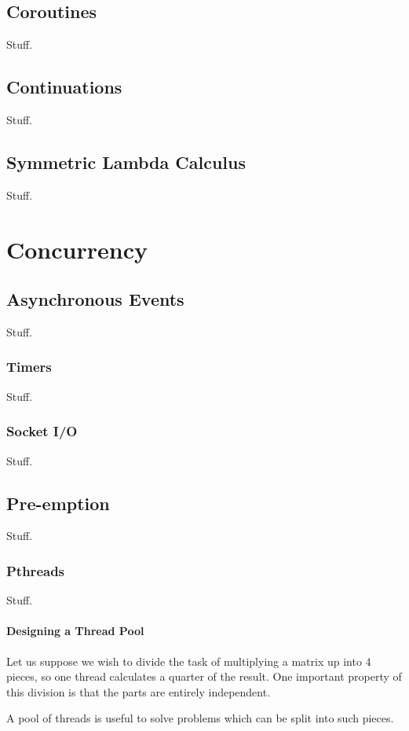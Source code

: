 \documentclass[oneside]{book}
\begin{document}
\chapter{Coroutines}
Stuff.
\chapter{Continuations}
Stuff.
\chapter{Symmetric Lambda Calculus}
Stuff.

\part{Concurrency}
\chapter{Asynchronous Events}
Stuff.
\section{Timers}
Stuff.
\section{Socket I/O}
Stuff.

\chapter{Pre-emption}
Stuff.
\section{Pthreads}
Stuff.
\subsection{Designing a Thread Pool}
Let us suppose we wish to divide the task of multiplying
a matrix up into 4 pieces, so one thread calculates
a quarter of the result. One important property of this 
division is that the parts are entirely independent.

A pool of threads is useful to solve problems which can
be split into such pieces.
\end{document}
